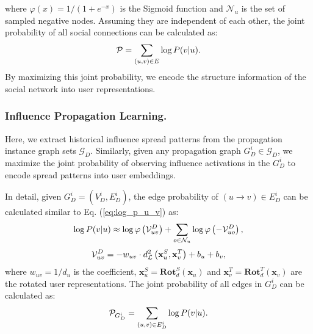 where $\varphi(x) = 1/(1+e^{-x})$ is the Sigmoid function and $\mathcal{N}_u$ is the set of sampled negative nodes.
Assuming they are independent of each other, the joint probability of all social connections can be calculated as:
\begin{equation} \small \mathcal{P} = \sum_{(u,v)\in E} \log P(v|u). \end{equation}
By maximizing this joint probability, we encode the structure information of the social network into user representations.


\subsubsection{Influence Propagation Learning.}
Here, we extract historical influence spread patterns from the propagation instance graph sets $\mathcal{G}_D$.
Similarly, given any propagation graph $G^i_D \in \mathcal{G}_D$, we maximize the joint probability of observing influence activations in the $G^i_D$ to encode spread patterns into user embeddings.

In detail, given $G^i_D = (V^i_D, E^i_D)$, the edge probability of $(u \rightarrow v) \in E^i_D$ can be calculated similar to Eq. (\ref{eq:log_p_u_v}) as:
\begin{equation}
\small \log P(v|u) \approx \log \varphi \left(\mathcal{V}^{D}_{uv}\right) + \sum_{o \in \mathcal{N}_u} \log \varphi \left( - \mathcal{V}^{D}_{uo}\right),
\end{equation}
\begin{equation}
\small \mathcal{V}^{D}_{uv} = - w_{uv} \cdot d^2_{\mathcal{L}}\left(\mathbf{x}^S_u, \mathbf{x}^T_v\right) + b_u + b_v,
\label{eq:propagation_score}
\end{equation}
where $ w_{uv} = 1/d_u $ is the coefficient, $\mathbf{x}^S_u = \mathbf{Rot}_{d}^S(\mathbf{x}_u)$ and $\mathbf{x}^T_v = \mathbf{Rot}_{d}^T(\mathbf{x}_v)$ are the rotated user representations. 
The joint probability of all edges in $G^{i}_D$ can be calculated as:
\begin{equation} \small \mathcal{P}_{G^i_D} = \sum_{(u,v)\in E^{i}_D} \log P(v|u). \end{equation}

